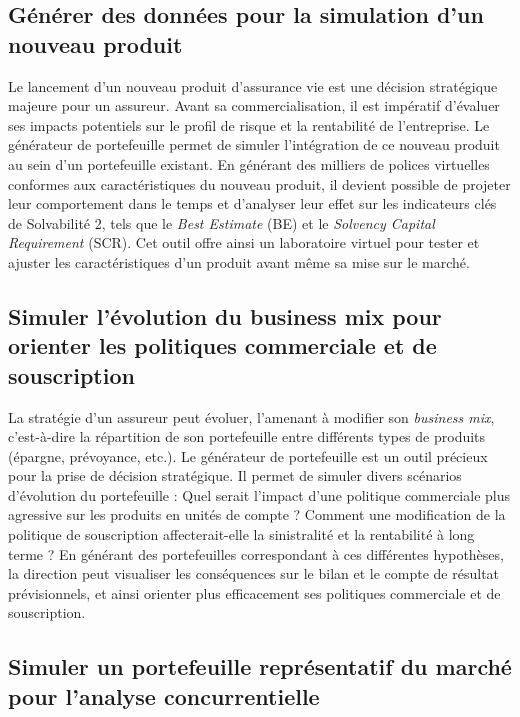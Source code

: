 \subsection{Générer des données pour la simulation d'un nouveau produit}

Le lancement d'un nouveau produit d'assurance vie est une décision stratégique majeure pour un assureur. Avant sa commercialisation, il est impératif d'évaluer ses impacts potentiels sur le profil de risque et la rentabilité de l'entreprise. Le générateur de portefeuille permet de simuler l'intégration de ce nouveau produit au sein d'un portefeuille existant. En générant des milliers de polices virtuelles conformes aux caractéristiques du nouveau produit, il devient possible de projeter leur comportement dans le temps et d'analyser leur effet sur les indicateurs clés de Solvabilité 2, tels que le \textit{Best Estimate} (BE) et le \textit{Solvency Capital Requirement} (SCR). Cet outil offre ainsi un laboratoire virtuel pour tester et ajuster les caractéristiques d'un produit avant même sa mise sur le marché.

\subsection{Simuler l'évolution du business mix pour orienter les politiques commerciale et de souscription}

La stratégie d'un assureur peut évoluer, l'amenant à modifier son \textit{business mix}, c'est-à-dire la répartition de son portefeuille entre différents types de produits (épargne, prévoyance, etc.). Le générateur de portefeuille est un outil précieux pour la prise de décision stratégique. Il permet de simuler divers scénarios d'évolution du portefeuille : Quel serait l'impact d'une politique commerciale plus agressive sur les produits en unités de compte ? Comment une modification de la politique de souscription affecterait-elle la sinistralité et la rentabilité à long terme ? En générant des portefeuilles correspondant à ces différentes hypothèses, la direction peut visualiser les conséquences sur le bilan et le compte de résultat prévisionnels, et ainsi orienter plus efficacement ses politiques commerciale et de souscription.

\subsection{Simuler un portefeuille représentatif du marché pour l'analyse concurrentielle}


